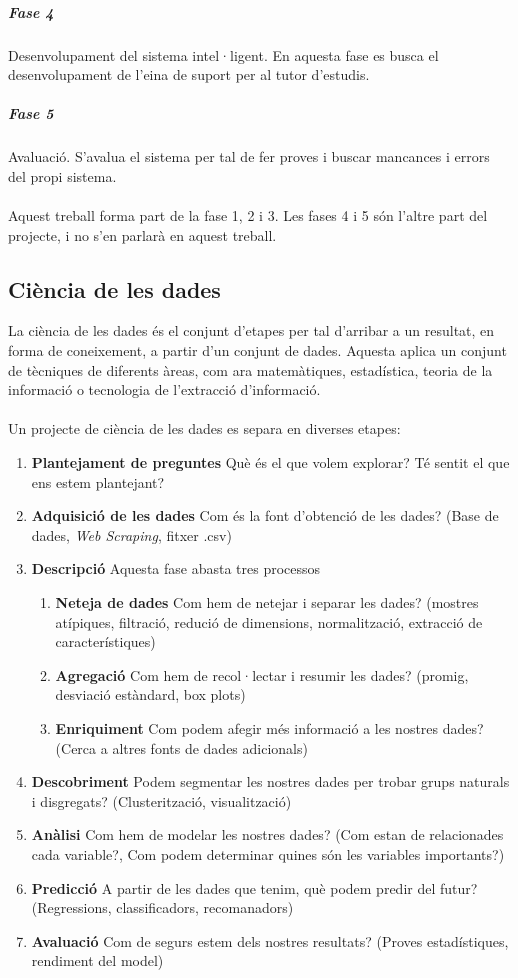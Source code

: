 \documentclass[12pt,a4paper,catalan]{article}
\begin{document}
\subparagraph{Fase 4}
Desenvolupament del sistema intel·ligent. En aquesta fase es busca el desenvolupament de l'eina de suport per al tutor d'estudis.

\subparagraph{Fase 5}
Avaluació. S'avalua el sistema per tal de fer proves i buscar mancances i errors del propi sistema.
\\
\\
Aquest treball forma part de la fase 1, 2 i 3. Les fases 4 i 5 són l'altre part del projecte, i no s'en parlarà en aquest treball.

\subsection{Ciència de les dades}
\label{subsec:cienciadelesdades}
La ciència de les dades és el conjunt d'etapes per tal d'arribar a un resultat, en forma de coneixement, a partir d'un conjunt de dades. Aquesta aplica un conjunt de tècniques de diferents àreas, com ara matemàtiques, estadística, teoria de la informació o tecnologia de l'extracció d'informació.
\\
\\
Un projecte de ciència de les dades es separa en diverses etapes:
\begin{enumerate}
	\item \textbf{Plantejament de preguntes} Què és el que volem explorar? Té sentit el que ens estem plantejant?
	\item \textbf{Adquisició de les dades} Com és la font d'obtenció de les dades? (Base de dades, \textit{Web Scraping}, fitxer .csv)
	\item \textbf{Descripció} Aquesta fase abasta tres processos
	\begin{enumerate}
		\item \textbf{Neteja de dades} Com hem de netejar i separar les dades? (mostres atípiques, filtració, redució de dimensions, normalització, extracció de característiques)
		\item \textbf{Agregació} Com hem de recol·lectar i resumir les dades? (promig, desviació estàndard, box plots)
		\item \textbf{Enriquiment} Com podem afegir més informació a les nostres dades? (Cerca a altres fonts de dades adicionals)
	\end{enumerate}
	\item \textbf{Descobriment} Podem segmentar les nostres dades per trobar grups naturals i disgregats? (Clusterització, visualització)
	\item \textbf{Anàlisi} Com hem de modelar les nostres dades? (Com estan de relacionades cada variable?, Com podem determinar quines són les variables importants?)
	\item \textbf{Predicció} A partir de les dades que tenim, què podem predir del futur? (Regressions, classificadors, recomanadors)
	\item \textbf{Avaluació} Com de segurs estem dels nostres resultats? (Proves estadístiques, rendiment del model)
\end{enumerate}
\end{document}
